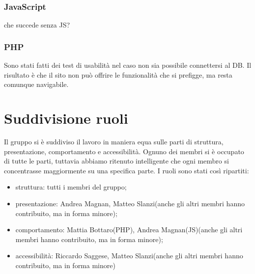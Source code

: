 	\subsubsection{JavaScript}
	che succede senza JS?
	\subsubsection{PHP}
	Sono stati fatti dei test di usabilità nel caso non sia possibile connettersi al DB. Il risultato è che il sito non può offrire le funzionalità che si prefigge, ma resta comunque navigabile.
	\section{Suddivisione ruoli}
	Il gruppo si è suddiviso il lavoro in maniera equa sulle parti di struttura, presentazione, comportamento e accessibilità.
	Ognuno dei membri si è occupato di tutte le parti, tuttavia abbiamo ritenuto intelligente che ogni membro si concentrasse maggiormente su una specifica parte.
	I ruoli sono stati così ripartiti:
	\begin{itemize}
		\item struttura: tutti i membri del gruppo;
		\item presentazione: Andrea Magnan, Matteo Slanzi(anche gli altri membri hanno contribuito, ma in forma minore);
		\item comportamento: Mattia Bottaro(PHP), Andrea Magnan(JS)(anche gli altri membri hanno contribuito, ma in forma minore);
		\item accessibilità: Riccardo Saggese, Matteo Slanzi(anche gli altri membri hanno contribuito, ma in forma minore)
	\end{itemize}
